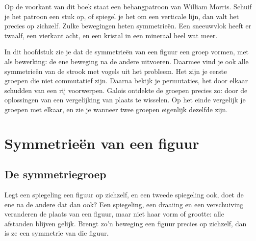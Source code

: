 Op de voorkant van dit boek staat een behangpatroon van William Morris. Schuif je het patroon een stuk op, of spiegel je het om een verticale lijn, dan valt het precies op zichzelf. Zulke bewegingen heten symmetrieën. Een sneeuwvlok heeft er twaalf, een vierkant acht, en een kristal in een mineraal heel wat meer.

In dit hoofdstuk zie je dat de symmetrieën van een figuur een groep vormen, met als bewerking: de ene beweging na de andere uitvoeren. Daarmee vind je ook alle symmetrieën van de strook met vogels uit het probleem. Het zijn je eerste groepen die niet commutatief zijn. Daarna bekijk je permutaties, het door elkaar schudden van een rij voorwerpen. Galois ontdekte de groepen precies zo: door de oplossingen van een vergelijking van plaats te wisselen. Op het einde vergelijk je groepen met elkaar, en zie je wanneer twee groepen eigenlijk dezelfde zijn.

\begin{oefeningen}[Start]

\end{oefeningen}


\section{Symmetrieën van een figuur}

\subsection{De symmetriegroep}

Legt een spiegeling een figuur op zichzelf, en een tweede spiegeling ook, doet de ene na de andere dat dan ook? Een spiegeling, een draaiing en een verschuiving veranderen de plaats van een figuur, maar niet haar vorm of grootte: alle afstanden blijven gelijk. Brengt zo'n beweging een figuur precies op zichzelf, dan is ze een symmetrie van die figuur.

